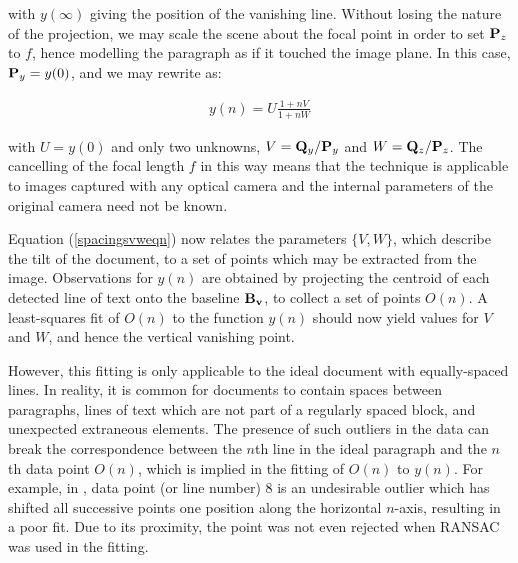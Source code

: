 {\parindent 0mm
with $y(\infty)$ giving the position of the vanishing line.
Without losing the nature of the projection, we may scale the scene about the focal point in order to set ${ \bf P }_z$ to $f$, hence modelling the paragraph as if it touched the image plane.  In this case, ${ \bf P }_y=y(0)$,
and we may rewrite  as:
}

\begin{eqnarray}
y(n) = U \frac{ 1 + nV }{ 1 + nW } \label{spacingsvweqn}
\end{eqnarray}

{ \parindent 0mm
with $U=y(0)$ and only two unknowns,
$V = {{ \bf Q }_y}/{{ \bf P }_y}$ and $W = {{ \bf Q }_z}/{{ \bf P }_z}$.
The cancelling of the focal length $f$ in this way means that the technique is applicable to images captured with any optical camera and the internal parameters of the original camera need not be known.

Equation (\ref{spacingsvweqn}) now relates the parameters $\{V,W\}$, which describe the
tilt of the document, to a set of points which may be extracted from the
image.
Observations for $y(n)$ are obtained by projecting the centroid of
each detected line of text onto the baseline ${ \bf B_v }$, to collect a set of
points $O(n)$.
A least-squares fit of $O(n)$ to the function $y(n)$ should now yield values for $V$ and $W$, and hence the vertical vanishing point.

However, this fitting is only applicable to the ideal document with
equally-spaced lines. 
In reality, it is common for documents to contain
spaces between paragraphs,
lines of text which are not part of a regularly spaced block,
and unexpected extraneous elements.
The presence of such outliers in the data can break the correspondence between
the $n$th line in the ideal paragraph and the $n$th data point $O(n)$, which is
implied in the fitting of $O(n)$ to $y(n)$.
For example, in , data point (or line number) 8 is an undesirable outlier
which has shifted all successive points one position along the horizontal $n$-axis,
resulting in a poor fit.
Due to its proximity, the point was not even rejected when RANSAC was used in
 the fitting.


}
